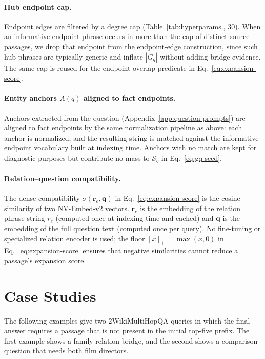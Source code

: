 \paragraph{Hub endpoint cap.}
Endpoint edges are filtered by a degree cap (Table~\ref{tab:hyperparams},
$30$). When an informative endpoint phrase occurs in more than the
cap of distinct source passages, we drop that endpoint from the
endpoint-edge construction, since such hub phrases are typically
generic and inflate $|G_q|$ without adding bridge evidence. The same
cap is reused for the endpoint-overlap predicate in
Eq.~\ref{eq:expansion-score}.

\paragraph{Entity anchors $A(q)$ aligned to fact endpoints.}
Anchors extracted from the question (Appendix~\ref{app:question-prompts})
are aligned to fact endpoints by the same normalization pipeline as
above: each anchor is normalized, and the resulting string is
matched against the informative-endpoint vocabulary built at
indexing time. Anchors with no match are kept for diagnostic
purposes but contribute no mass to $\mathcal{S}_q$ in
Eq.~\ref{eq:gq-seed}.

\paragraph{Relation--question compatibility.}
The dense compatibility $\sigma(\mathbf{r}_e, \mathbf{q})$ in
Eq.~\ref{eq:expansion-score} is the cosine similarity of two
NV-Embed-v2 vectors. $\mathbf{r}_e$ is the embedding of the relation
phrase string $r_e$ (computed once at indexing time and cached) and
$\mathbf{q}$ is the embedding of the full question text (computed
once per query). No fine-tuning or specialized relation encoder is
used; the floor $[x]_{+}=\max(x,0)$ in Eq.~\ref{eq:expansion-score}
ensures that negative similarities cannot reduce a passage's
expansion score.

\section{Case Studies}
\label{app:case-study}

The following examples give two 2WikiMultiHopQA queries in which the
final answer requires a passage that is not present in the initial
top-five prefix. The first example shows a family-relation bridge, and
the second shows a comparison question that needs both film directors.

